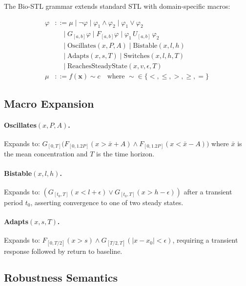 \documentclass[11pt]{article}
\begin{document}
The Bio-STL grammar extends standard STL with domain-specific macros:

\begin{align*}
\varphi &::= \mu \mid \neg\varphi \mid \varphi_1 \land \varphi_2
         \mid \varphi_1 \lor \varphi_2 \\
        &\quad\mid G_{[a,b]}\varphi \mid F_{[a,b]}\varphi
         \mid \varphi_1\,U_{[a,b]}\,\varphi_2 \\
        &\quad\mid \text{Oscillates}(x, P, A)
         \mid \text{Bistable}(x, l, h) \\
        &\quad\mid \text{Adapts}(x, s, T)
         \mid \text{Switches}(x, l, h, T) \\
        &\quad\mid \text{ReachesSteadyState}(x, v, \epsilon, T) \\
\mu &::= f(\mathbf{x}) \sim c \quad\text{where } {\sim} \in \{<, \leq, >, \geq, =\}
\end{align*}

\subsection{Macro Expansion}

\paragraph{Oscillates$(x, P, A)$.}
Expands to: $G_{[0,T]}\big(F_{[0,1.2P]}(x > \bar{x} + A) \land
F_{[0,1.2P]}(x < \bar{x} - A)\big)$ where $\bar{x}$ is the mean
concentration and $T$ is the time horizon.

\paragraph{Bistable$(x, l, h)$.}
Expands to: $(G_{[t_0,T]}(x < l + \epsilon) \lor G_{[t_0,T]}(x > h - \epsilon))$
after a transient period $t_0$, asserting convergence to one of two
steady states.

\paragraph{Adapts$(x, s, T)$.}
Expands to: $F_{[0,T/2]}(x > s) \land G_{[T/2,T]}(|x - x_0| < \epsilon)$,
requiring a transient response followed by return to baseline.

\subsection{Robustness Semantics}
\end{document}

